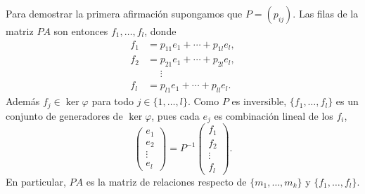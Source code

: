Para demostrar la primera afirmación supongamos que $P=(p_{ij})$. Las filas de la matriz $PA$ son entonces
$f_1,\dots,f_l$, donde 
\begin{align*}
f_1 &= p_{11}e_1+\cdots+p_{1l}e_l,\\
f_2 &= p_{21}e_1+\cdots+p_{2l}e_l,\\
&\phantom{=}\vdots\\
f_l &= p_{l1}e_1+\cdots+p_{ll}e_l.	
\end{align*}
Además $f_j\in\ker\varphi$ para todo $j\in\{1,\dots,l\}$. 
Como $P$ es inversible, $\{f_1,\dots,f_l\}$ es un conjunto de generadores de $\ker\varphi$, pues
cada $e_j$ es combinación lineal de los $f_i$,  
\[
\begin{pmatrix}
e_1\\
e_2\\
\vdots\\
e_l	
\end{pmatrix}
=P^{-1}\begin{pmatrix}
f_1\\
f_2\\
\vdots\\
f_l
\end{pmatrix}.
\]
En particular, $PA$ es la matriz de relaciones respecto de $\{m_1,\dots,m_k\}$ y $\{f_1,\dots,f_l\}$.  

